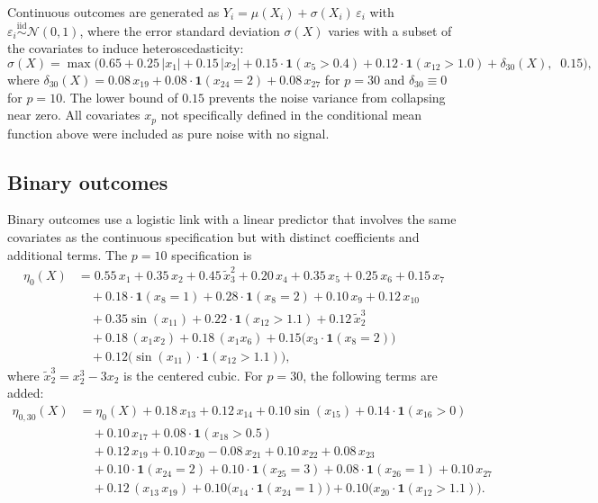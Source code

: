 \documentclass[11pt]{article}
\theoremstyle{plain}
\theoremstyle{definition}
\theoremstyle{remark}
\begin{document}
Continuous outcomes are generated as $Y_i = \mu(X_i) + \sigma(X_i)\,\varepsilon_i$ with $\varepsilon_i \overset{\mathrm{iid}}{\sim} \mathcal{N}(0,1)$, where the error standard deviation $\sigma(X)$ varies with a subset of the covariates to induce heteroscedasticity:
\[
\sigma(X) = \max\!\Big(0.65 + 0.25\,|x_1| + 0.15\,|x_2| + 0.15\cdot\mathbf{1}(x_5 > 0.4) + 0.12\cdot\mathbf{1}(x_{12} > 1.0) + \delta_{30}(X),\;\; 0.15\Big),
\]
where $\delta_{30}(X) = 0.08\,x_{19} + 0.08\cdot\mathbf{1}(x_{24}{=}2) + 0.08\,x_{27}$ for $p = 30$ and $\delta_{30} \equiv 0$ for $p = 10$. The lower bound of $0.15$ prevents the noise variance from collapsing near zero. All covariates $x_p$ not specifically defined in the conditional mean function above were included as pure noise with no signal. 

\subsection*{Binary outcomes}
Binary outcomes use a logistic link with a linear predictor that involves the same covariates as the continuous specification but with distinct coefficients and additional terms. The $p = 10$ specification is
\begin{align*}
	\eta_0(X) &= 0.55\,x_1 + 0.35\,x_2 + 0.45\,\tilde{x}_3^2 + 0.20\,x_4 + 0.35\,x_5 + 0.25\,x_6 + 0.15\,x_7 \\
	&\quad + 0.18\cdot\mathbf{1}(x_8{=}1) + 0.28\cdot\mathbf{1}(x_8{=}2) + 0.10\,x_9 + 0.12\,x_{10} \\
	&\quad + 0.35\sin(x_{11}) + 0.22\cdot\mathbf{1}(x_{12} > 1.1) + 0.12\,\tilde{x}_2^3 \\
	&\quad + 0.18\,(x_1 x_2) + 0.18\,(x_1 x_6) + 0.15\bigl(x_3\cdot\mathbf{1}(x_8{=}2)\bigr) \\
	&\quad + 0.12\bigl(\sin(x_{11})\cdot\mathbf{1}(x_{12} > 1.1)\bigr),
\end{align*}
where $\tilde{x}_2^3 = x_2^3 - 3x_2$ is the centered cubic. For $p = 30$, the following terms are added:
\begin{align*}
	\eta_{0,30}(X) &= \eta_0(X) + 0.18\,x_{13} + 0.12\,x_{14} + 0.10\sin(x_{15}) + 0.14\cdot\mathbf{1}(x_{16} > 0) \\
	&\quad + 0.10\,x_{17} + 0.08\cdot\mathbf{1}(x_{18} > 0.5) \\
	&\quad + 0.12\,x_{19} + 0.10\,x_{20} - 0.08\,x_{21} + 0.10\,x_{22} + 0.08\,x_{23} \\
	&\quad + 0.10\cdot\mathbf{1}(x_{24}{=}2) + 0.10\cdot\mathbf{1}(x_{25}{=}3) + 0.08\cdot\mathbf{1}(x_{26}{=}1) + 0.10\,x_{27} \\
	&\quad + 0.12\,(x_{13}\,x_{19}) + 0.10\bigl(x_{14}\cdot\mathbf{1}(x_{24}{=}1)\bigr) + 0.10\bigl(x_{20}\cdot\mathbf{1}(x_{12} > 1.1)\bigr).
\end{align*}
\end{document}
